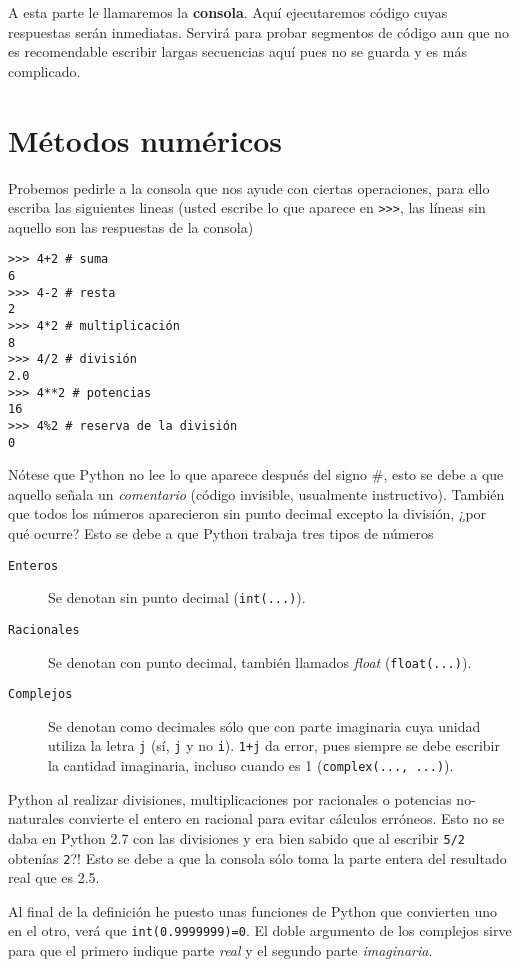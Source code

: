 \documentclass[11pt,twoside]{report}
\begin{document}
A esta parte le llamaremos la \textbf{consola}. Aquí ejecutaremos código cuyas respuestas serán inmediatas. Servirá para probar segmentos de código aun que no es recomendable escribir largas secuencias aquí pues no se guarda y es más complicado.

\section{Métodos numéricos}
Probemos pedirle a la consola que nos ayude con ciertas operaciones, para ello escriba las siguientes lineas (usted escribe lo que aparece en \lstinline|>>>|, las líneas sin aquello son las respuestas de la consola)
\begin{lstlisting}
>>> 4+2 # suma
6
>>> 4-2 # resta
2
>>> 4*2 # multiplicación
8
>>> 4/2 # división
2.0
>>> 4**2 # potencias
16
>>> 4%2 # reserva de la división
0
\end{lstlisting}
Nótese que Python no lee lo que aparece después del signo \#{}, esto se debe a que aquello señala un \textit{comentario} (código invisible, usualmente instructivo). También que todos los números aparecieron sin punto decimal excepto la división, ¿por qué ocurre? Esto se debe a que Python trabaja tres tipos de números
\begin{description}
\item[\tt Enteros] Se denotan sin punto decimal (\lstinline|int(...)|).
\item[\tt Racionales] Se denotan con punto decimal, también llamados \textit{float} (\lstinline|float(...)|).
\item[\tt Complejos] Se denotan como decimales sólo que con parte imaginaria cuya unidad utiliza la letra \texttt{j} (sí, \texttt{j} y no \texttt{i}). \lstinline|1+j| da error, pues siempre se debe escribir la cantidad imaginaria, incluso cuando es 1 (\lstinline|complex(..., ...)|).
\end{description}
Python al realizar divisiones, multiplicaciones por racionales o potencias no-naturales convierte el entero en racional para evitar cálculos erróneos. Esto no se daba en Python 2.7 con las divisiones y era bien sabido que al escribir \lstinline|5/2| obtenías \lstinline|2|?! Esto se debe a que la consola sólo toma la parte entera del resultado real que es 2.5.

Al final de la definición he puesto unas funciones de Python que convierten uno en el otro, verá que \lstinline|int(0.9999999)=0|. El doble argumento de los complejos sirve para que el primero indique parte \textit{real} y el segundo parte \textit{imaginaria}.
\end{document}
